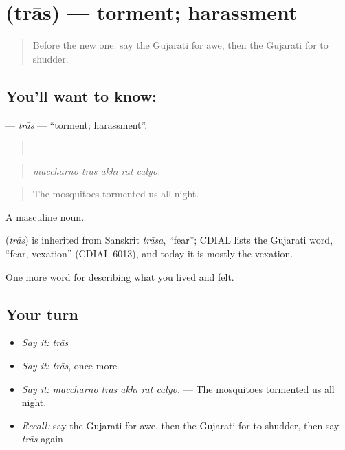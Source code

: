 \section[\texorpdfstring{\gu{ત્રાસ} (trās)}{ત્રાસ (trās)}]{ (trās) — torment; harassment}

\label{lesson:GU-C453-tras}



\begin{quote}
Before the new one: say the Gujarati for awe, then the Gujarati for to shudder.
\end{quote}

\subsection*{You'll want to know: }
\textbf{} — \emph{trās} — \textquotedblleft{}torment; harassment\textquotedblright{}.

\begin{quote}
    .
\end{quote}

\begin{quote}
\emph{maccharno trās ākhī rāt cālyo.}
\end{quote}

\begin{quote}
The mosquitoes tormented us all night.
\end{quote}

A masculine noun.

\begin{cousinweb}
\textbf{} (\emph{trās}) is inherited from Sanskrit \emph{trāsa}, \textquotedblleft{}fear\textquotedblright{}; CDIAL lists the Gujarati word, \textquotedblleft{}fear, vexation\textquotedblright{} (CDIAL 6013), and today it is mostly the vexation.
\end{cousinweb}

\begin{grammarlens}[title={What you've built}]
One more word for describing what you lived and felt.
\end{grammarlens}

\subsection*{Your turn}
\begin{itemize}
\raggedright
  \item \emph{Say it:} \emph{trās}
  \item \emph{Say it:} \emph{trās}, once more
  \item \emph{Say it:} \emph{maccharno trās ākhī rāt cālyo.} — The mosquitoes tormented us all night.
  \item \emph{Recall:} say the Gujarati for awe, then the Gujarati for to shudder, then say \emph{trās} again
\end{itemize}

